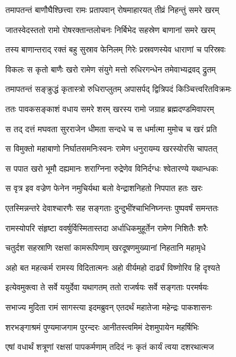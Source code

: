 \twolineshloka
{तमापतन्तं बाणौघैश्छित्त्वा रामः प्रतापवान्}
{रोषमाहारयत् तीव्रं निहन्तुं समरे खरम्} %

\twolineshloka
{जातस्वेदस्ततो रामो रोषरक्तान्तलोचनः}
{निर्बिभेद सहस्रेण बाणानां समरे खरम्} %

\twolineshloka
{तस्य बाणान्तराद् रक्तं बहु सुस्राव फेनिलम्}
{गिरेः प्रस्रवणस्येव धाराणां च परिस्रवः} %

\twolineshloka
{विकलः स कृतो बाणैः खरो रामेण संयुगे}
{मत्तो रुधिरगन्धेन तमेवाभ्यद्रवद् द्रुतम्} %

\twolineshloka
{तमापतन्तं सङ्क्रुद्धं कृतास्त्रो रुधिराप्लुतम्}
{अपासर्पद् द्वित्रिपदं किञ्चित्त्वरितविक्रमः} %

\twolineshloka
{ततः पावकसङ्काशं वधाय समरे शरम्}
{खरस्य रामो जग्राह ब्रह्मदण्डमिवापरम्} %

\twolineshloka
{स तद् दत्तं मघवता सुरराजेन धीमता}
{सन्दधे च स धर्मात्मा मुमोच च खरं प्रति} %

\twolineshloka
{स विमुक्तो महाबाणो निर्घातसमनिःस्वनः}
{रामेण धनुरायम्य खरस्योरसि चापतत्} %

\twolineshloka
{स पपात खरो भूमौ दह्यमानः शराग्निना}
{रुद्रेणेव विनिर्दग्धः श्वेतारण्ये यथान्धकः} %

\twolineshloka
{स वृत्र इव वज्रेण फेनेन नमुचिर्यथा}
{बलो वेन्द्राशनिहतो निपपात हतः खरः} %

\twolineshloka
{एतस्मिन्नन्तरे देवाश्चारणैः सह सङ्गताः}
{दुन्दुभींश्चाभिनिघ्नन्तः पुष्पवर्षं समन्ततः} %

\twolineshloka
{रामस्योपरि संहृष्टा ववर्षुर्विस्मितास्तदा}
{अर्धाधिकमुहूर्तेन रामेण निशितैः शरैः} %

\twolineshloka
{चतुर्दश सहस्राणि रक्षसां कामरूपिणाम्}
{खरदूषणमुख्यानां निहतानि महामृधे} %

\twolineshloka
{अहो बत महत्कर्म रामस्य विदितात्मनः}
{अहो वीर्यमहो दार्ढ्यं विष्णोरिव हि दृश्यते} %

\twolineshloka
{इत्येवमुक्त्वा ते सर्वे ययुर्देवा यथागतम्}
{ततो राजर्षयः सर्वे सङ्गताः परमर्षयः} %

\twolineshloka
{सभाज्य मुदिता रामं सागस्त्या इदमब्रुवन्}
{एतदर्थं महातेजा महेन्द्रः पाकशासनः} %

\twolineshloka
{शरभङ्गाश्रमं पुण्यमाजगाम पुरन्दरः}
{आनीतस्त्वमिमं देशमुपायेन महर्षिभिः} %

\twolineshloka
{एषां वधार्थं शत्रूणां रक्षसां पापकर्मणाम्}
{तदिदं नः कृतं कार्यं त्वया दशरथात्मज} %

